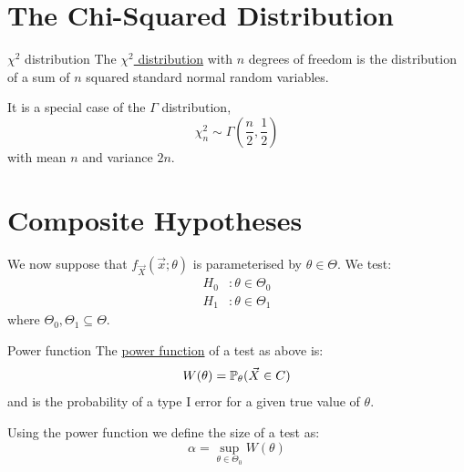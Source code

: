 \documentclass[../Main.tex]{subfiles}
\begin{document}
\section{The Chi-Squared Distribution}
\begin{definition}{$\chi^2$ distribution}
    The \underline{$\chi^2$ distribution} with $n$ degrees of freedom is the distribution of a sum of $n$ squared standard normal random variables.
\end{definition}
It is a special case of the $\Gamma$ distribution,
\begin{equation*}
    \chi_n^2 \sim \Gamma\left(\frac{n}{2}, \frac12\right)
\end{equation*}
with mean $n$ and variance $2n$.
\section{Composite Hypotheses}
We now suppose that $f_{\vec{X}}(\vec{x};\theta)$ is parameterised by $\theta \in \Theta$. We test:
\begin{align*}
    H_0&: \theta \in \Theta_0 \\
    H_1&: \theta \in \Theta_1
\end{align*}
where $\Theta_0, \Theta_1 \subseteq \Theta$.
\begin{definition}{Power function}
    The \underline{power function} of a test as above is:
    \begin{equation*}
        W(\theta) = \P_\theta(\vec{X} \in C)
    \end{equation*}
    and is the probability of a type I error for a given true value of $\theta$.
\end{definition}
Using the power function we define the size of a test as:
\begin{equation*}
    \alpha = \sup_{\theta \in \Theta_0} W(\theta)
\end{equation*}
\end{document}
